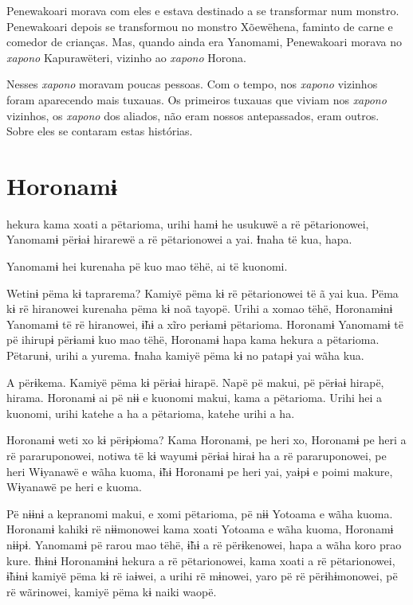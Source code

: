 Penewakoari morava com eles e estava destinado a se transformar num
monstro. Penewakoari depois se transformou no monstro Xõewëhena, faminto
de carne e comedor de crianças. Mas, quando ainda era Yanomami,
Penewakoari morava no \textit{xapono} Kapurawëteri, vizinho ao
\textit{xapono} Horona.

Nesses \textit{xapono} moravam poucas pessoas. Com o tempo, nos \textit{xapono} vizinhos
foram aparecendo mais tuxauas. Os primeiros tuxauas que viviam nos
\textit{xapono} vizinhos, os \textit{xapono} dos aliados, não eram nossos
antepassados, eram outros. Sobre eles se contaram estas histórias.

\chapter{Horonamɨ}

 hekura kama xoati a pëtarioma, urihi hamɨ he usukuwë a rë
pëtarionowei, Yanomamɨ përɨaɨ hirarewë a rë pëtarionowei a yai. Ɨnaha të
kua, hapa. 

Yanomamɨ hei kurenaha pë kuo mao tëhë, ai të kuonomi. 

Wetinɨ pëma kɨ taprarema? Kamiyë pëma kɨ rë pëtarionowei të ã yai kua.
Pëma kɨ rë hiranowei kurenaha pëma kɨ noã tayopë. Urihi a xomao tëhë,
Horonamɨnɨ Yanomamɨ të rë hiranowei, ɨ̃hɨ a xĩro perɨamɨ pëtarioma.
Horonamɨ Yanomamɨ të pë ihirupɨ përɨamɨ kuo mao tëhë, Horonamɨ hapa kama
hekura a pëtarioma. Pëtarunɨ, urihi a yurema. Ɨnaha kamiyë pëma kɨ no
patapɨ yai wãha kua. 

A përɨkema. Kamiyë pëma kɨ përɨaɨ hirapë. Napë pë makui, pë përɨaɨ
hirapë, hirama. Horonamɨ ai pë nɨɨ e kuonomi makui, kama a pëtarioma.
Urihi hei a kuonomi, urihi katehe a ha a pëtarioma, katehe urihi a ha. 

Horonamɨ weti xo kɨ përɨpɨoma? Kama Horonamɨ, pe heri xo, Horonamɨ pe
heri a rë pararuponowei, notiwa të kɨ wayumɨ përɨaɨ hiraɨ ha a rë
pararuponowei, pe heri Wɨyanawë e wãha kuoma, ɨ̃hɨ Horonamɨ pe heri yai,
yaɨpɨ e poimi makure, Wɨyanawë pe heri e kuoma. 

Pë nɨɨnɨ a kepranomi makui, e xomi pëtarioma, pë nɨɨ Yotoama e wãha
kuoma. Horonamɨ kahikɨ rë nɨɨmonowei kama xoati Yotoama e wãha kuoma,
Horonamɨ nɨɨpɨ. Yanomamɨ pë rarou mao tëhë, ɨ̃hɨ a rë përɨkenowei, hapa a
wãha koro prao kure. Ɨhɨnɨ Horonamɨnɨ hekura a rë pëtarionowei, kama
xoati a rë pëtarionowei, ɨ̃hɨnɨ kamiyë pëma kɨ rë iaɨwei, a urihi rë
mɨnowei, yaro pë rë përɨhɨmonowei, pë rë wãrinowei, kamiyë pëma kɨ naiki
waopë. 

